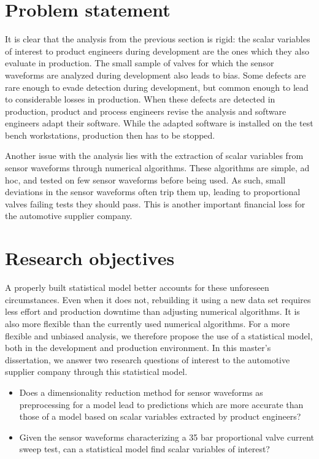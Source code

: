 \section{Problem statement}

It is clear that the analysis from the previous section is rigid\thinspace: the scalar variables of interest to product engineers during development are the ones which they also evaluate in production.
The small sample of valves for which the sensor waveforms are analyzed during development also leads to bias.
Some defects are rare enough to evade detection during development, but common enough to lead to considerable losses in production.
When these defects are detected in production, product and process engineers revise the analysis and software engineers adapt their software.
While the adapted software is installed on the test bench workstations, production then has to be stopped.

Another issue with the analysis lies with the extraction of scalar variables from sensor waveforms through numerical algorithms.
These algorithms are simple, ad hoc, and tested on few sensor waveforms before being used.
As such, small deviations in the sensor waveforms often trip them up, leading to proportional valves failing tests they should pass.
This is another important financial loss for the automotive supplier company.

\section{Research objectives}

A properly built statistical model better accounts for these unforeseen circumstances.
Even when it does not, rebuilding it using a new data set requires less effort and production downtime than adjusting numerical algorithms.
It is also more flexible than the currently used numerical algorithms.
For a more flexible and unbiased analysis, we therefore propose the use of a statistical model, both in the development
and production environment.
In this master's dissertation, we answer two research questions of interest to the automotive supplier company through this statistical model.

\begin{itemize}
      \item Does a dimensionality reduction method for sensor waveforms as
            preprocessing for a model lead to predictions which are more accurate than those of a model based on scalar variables extracted by product engineers?
      \item Given the sensor waveforms characterizing a 35 bar proportional valve current sweep test, can a statistical
            model find scalar variables of interest?
\end{itemize}

